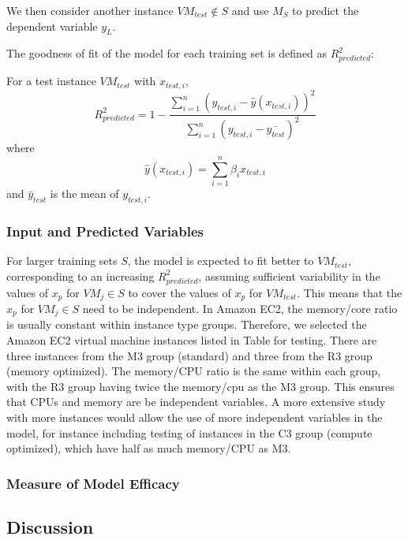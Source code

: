 {We then consider another instance $VM_{test}\notin S$ and use $M_S$ to predict the dependent variable $y_L$.

The goodness of fit of the model for each training set is defined as $R^2_{predicted}$:
\begin{definition}
For a test instance $VM_{test}$ with $x_{test,i}$,
\begin{displaymath}
R_{predicted}^2=1-\frac{\sum_{i=1}^{n} (y_{test,i} - \hat{y}(x_{test,i}))^{2}}{\sum_{i=1}^{n} (y_{test,i} - \bar{y_{test}})^{2}}
\end{displaymath}
where
\begin{displaymath}
\hat{y}(x_{test,i})=\sum_{i=1}^{n} \beta_i x_{test,i}
\end{displaymath}
and $\bar{y}_{test}$ is the mean of $y_{test,i}$.
\end{definition}

\subsubsection{Input and Predicted Variables}

For larger training sets $S$, the model is expected to fit better to $VM_{test}$, corresponding to an increasing $R^2_{predicted}$, assuming sufficient variability in the values of $x_p$ for $VM_j\in S$ to cover the values of $x_p$ for $VM_{test}$.  This means that the $x_p$ for $VM_j\in S$ need to be independent.  In Amazon EC2, the memory/core ratio is usually constant within instance type groups.  Therefore, we selected the Amazon EC2 virtual machine instances listed in Table \label{table:awstypes} for testing.  There are three instances from the M3 group (standard) and three from the R3 group (memory optimized).  The memory/CPU ratio is the same within each group, with the R3 group having twice the memory/cpu as the M3 group.  This ensures that CPUs and memory are be independent variables.  A more extensive study with more instances would allow the use of more independent variables in the model, for instance including testing of instances in the C3 group (compute optimized), which have half as much memory/CPU as M3.
}
  
\subsubsection{Measure of Model Efficacy}  
  
\subsection{Discussion}
\vspace{10pt}

